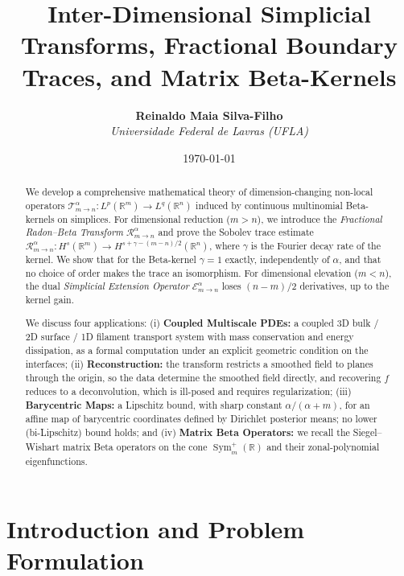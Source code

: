 \documentclass[11pt,a4paper]{article}
\title{\textbf{Inter-Dimensional Simplicial Transforms, Fractional Boundary Traces, and Matrix Beta-Kernels}}
\author{\textbf{Reinaldo Maia Silva-Filho} \\ \textit{Universidade Federal de Lavras (UFLA)}}
\date{\today}
\theoremstyle{plain}
\theoremstyle{definition}
\theoremstyle{remark}
\numberwithin{equation}{section}
\begin{document}
\maketitle

\begin{abstract}
We develop a comprehensive mathematical theory of dimension-changing non-local operators $\mathcal{T}_{m \to n}^\alpha : L^p(\mathbb{R}^m) \to L^q(\mathbb{R}^n)$ induced by continuous multinomial Beta-kernels on simplices. For dimensional reduction ($m > n$), we introduce the \emph{Fractional Radon--Beta Transform} $\mathcal{R}_{m \to n}^\alpha$ and prove the Sobolev trace estimate $\mathcal{R}_{m \to n}^\alpha : H^s(\mathbb{R}^m) \to H^{s + \gamma - (m-n)/2}(\mathbb{R}^n)$, where $\gamma$ is the Fourier decay rate of the kernel. We show that for the Beta-kernel $\gamma = 1$ exactly, independently of $\alpha$, and that no choice of order makes the trace an isomorphism. For dimensional elevation ($m < n$), the dual \emph{Simplicial Extension Operator} $\mathcal{E}_{m \to n}^\alpha$ loses $(n-m)/2$ derivatives, up to the kernel gain.

We discuss four applications: (i) \textbf{Coupled Multiscale PDEs:} a coupled 3D bulk / 2D surface / 1D filament transport system with mass conservation and energy dissipation, as a formal computation under an explicit geometric condition on the interfaces; (ii) \textbf{Reconstruction:} the transform restricts a smoothed field to planes through the origin, so the data determine the smoothed field directly, and recovering $f$ reduces to a deconvolution, which is ill-posed and requires regularization; (iii) \textbf{Barycentric Maps:} a Lipschitz bound, with sharp constant $\alpha/(\alpha+m)$, for an affine map of barycentric coordinates defined by Dirichlet posterior means; no lower (bi-Lipschitz) bound holds; and (iv) \textbf{Matrix Beta Operators:} we recall the Siegel--Wishart matrix Beta operators on the cone $\operatorname{Sym}_m^+(\mathbb{R})$ and their zonal-polynomial eigenfunctions.
\end{abstract}

\tableofcontents
\newpage

\section{Introduction and Problem Formulation}
\end{document}
